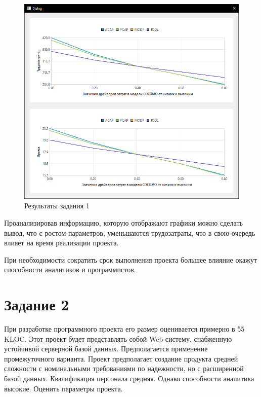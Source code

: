 \begin{figure}[!h]
	\centering
	\includegraphics[width=1\linewidth]{inc/img/3.png}
	\caption{Результаты задания 1}
	\label{p3}
\end{figure}

Проанализировав информацию, которую отображают графики можно
сделать вывод, что с ростом параметров, уменьшаются трудозатраты, что в свою
очередь влияет на время реализации проекта.

При необходимости сократить срок выполнения проекта большее влияние окажут способности аналитиков и программистов.

\section*{Задание 2}
При разработке программного проекта его размер оценивается примерно в 55 KLOC. Этот проект будет представлять собой Web-систему, снабженную устойчивой серверной базой данных. Предполагается применение промежуточного варианта. Проект предполагает создание продукта средней сложности с номинальными требованиями по надежности, но с расширенной базой данных. Квалификация персонала средняя. Однако способности аналитика высокие. Оценить параметры проекта.


